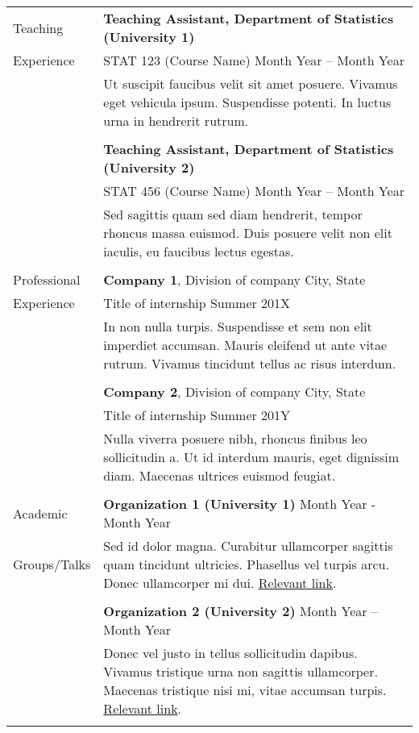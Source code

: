 \documentclass[letterpaper, 10pt]{article}
\begin{document}
\begin{longtable}{p{1.1in}p{5in}}
{\sc Teaching}   &  \textbf{Teaching Assistant, Department of Statistics (University 1)}\\
{\sc Experience} &  STAT 123 (Course Name) \hfill Month Year -- Month Year\\
& Ut suscipit faucibus velit sit amet posuere. Vivamus eget vehicula ipsum. Suspendisse potenti. In luctus urna in hendrerit rutrum.\\
& \\
& \textbf{Teaching Assistant, Department of Statistics (University 2)}\\
& STAT 456 (Course Name) \hfill Month Year -- Month Year\\
& Sed sagittis quam sed diam hendrerit, tempor rhoncus massa euismod. Duis posuere velit non elit iaculis, eu faucibus lectus egestas. \\
&\\

{\sc Professional} & {\textbf{Company 1}}, Division of company  \hfill City, State\\
{\sc Experience}& Title of internship \hfill Summer 201X\\
& In non nulla turpis. Suspendisse et sem non elit imperdiet accumsan. Mauris eleifend ut ante vitae rutrum. Vivamus tincidunt tellus ac risus interdum.\\
&\\ 
&{\textbf{Company 2}}, Division of company \hfill City, State\\
& Title of internship \hfill Summer 201Y \\
& Nulla viverra posuere nibh, rhoncus finibus leo sollicitudin a. Ut id interdum mauris, eget dignissim diam. Maecenas ultrices euismod feugiat.\\
& \\

{\sc Academic}     & \textbf{Organization 1 (University 1)} \hfill Month Year - Month Year \\
{\sc Groups/Talks} & Sed id dolor magna. Curabitur ullamcorper sagittis quam tincidunt ultricies. Phasellus vel turpis arcu. Donec ullamcorper mi dui. \href{ }{Relevant link}.\\
&\\
& \textbf{Organization 2 (University 2)} \hfill Month Year -- Month Year \\
& Donec vel justo in tellus sollicitudin dapibus. Vivamus tristique urna non sagittis ullamcorper. Maecenas tristique nisi mi, vitae accumsan turpis. \href{ }{Relevant link}.\\
& \\


\end{longtable}
\end{document}
